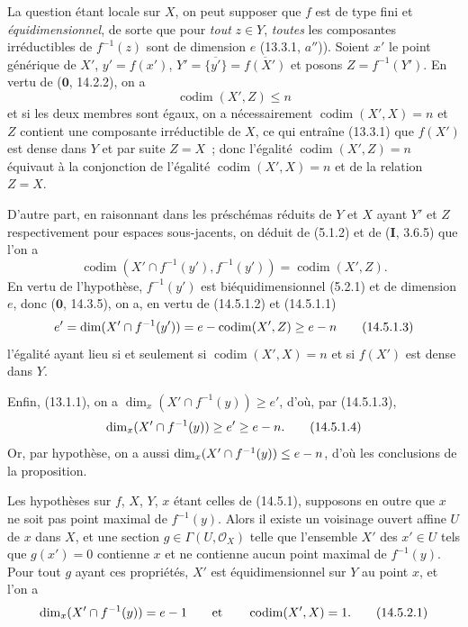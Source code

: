 La question étant locale sur $X$, on peut supposer que $f$ est de type fini et
\emph{équidimensionnel}, de sorte que pour \emph{tout} $z\in Y$, \emph{toutes} les
composantes irréductibles de $f^{-1}(z)$ sont de dimension $e$ (13.3.1, $a''$)).
Soient $x'$ le point générique de $X'$, $y'=f(x')$,
$Y'=\overline{\{y'\}}=\overline{f(X')}$ et posons $Z=f^{-1}(Y')$. En vertu de
($\mathbf 0$, 14.2.2), on a
\begin{equation}
  \operatorname{codim}(X',Z)\leq n
  \tag{14.5.1.1}\label{IV.14.5.1.1-fr}
\end{equation}
et si les deux membres sont égaux, on a nécessairement $\operatorname{codim}(X',X)=n$ et $Z$
contient une composante irréductible de $X$, ce qui entraîne (13.3.1) que
$f(X')$ est dense dans $Y$ et par suite $Z=X$~; donc l'égalité
$\operatorname{codim}(X',Z)=n$ équivaut à la conjonction de l'égalité $\operatorname{codim}(X',X)=n$ et de
la relation $Z=X$.

D'autre part, en raisonnant dans les préschémas réduits de $Y$ et $X$ ayant $Y'$
et $Z$ respectivement pour espaces sous-jacents, on déduit de (5.1.2) et de
(\textbf{I}, 3.6.5) que l'on a
\begin{equation}
  \operatorname{codim}(X'\cap f^{-1}(y'),f^{-1}(y'))=\operatorname{codim}(X',Z).
  \tag{14.5.1.2}\label{IV.14.5.1.2-fr}
\end{equation}
En vertu de l'hypothèse, $f^{-1}(y')$ est biéquidimensionnel (5.2.1) et de
dimension $e$, donc ($\mathbf 0$, 14.3.5), on a, en vertu de (14.5.1.2) et
(14.5.1.1)
\begin{equation}
  e'=\dim(X'\cap f^{-1}(y'))=e-\operatorname{codim}(X',Z)\geq e- n
  \tag{14.5.1.3}\label{IV.14.5.1.3-fr}
\end{equation}
l'égalité ayant lieu si et seulement si $\operatorname{codim}(X',X)=n$ et si $f(X')$ est dense
dans $Y$.

Enfin, (13.1.1), on a $\dim_x(X'\cap f^{-1}(y))\geq e'$, d'où, par
(14.5.1.3),
\begin{equation}
  \dim_x(X'\cap f^{-1}(y))\geq e'\geq e- n.
  \tag{14.5.1.4}\label{IV.14.5.1.4-fr}
\end{equation}
Or, par hypothèse, on a aussi $\dim_x(X'\cap f^{-1}(y))\leq e- n$, d'où les
conclusions de la proposition.

\begin{corollary}[14.5.2]
\label{IV.14.5.2-fr}
Les hypothèses sur $f$, $X$, $Y$, $x$ étant celles de \textup{(14.5.1)}, supposons en
outre que $x$ ne soit pas point maximal de $f^{-1}(y)$. Alors il existe un
voisinage ouvert affine $U$ de $x$ dans $X$, et une section
$g\in\Gamma(U,\mathcal O_X)$ telle que l'ensemble $X'$ des $x'\in U$ tels que
$g(x')=0$ contienne $x$ et ne contienne aucun point maximal de $f^{-1}(y)$. Pour
tout $g$ ayant ces propriétés, $X'$ est équidimensionnel sur $Y$ au point $x$, et
l'on a
\begin{equation}
  \dim_x(X'\cap f^{-1}(y))=e- 1 \qquad\text{et}\qquad \operatorname{codim}(X',X)=1.
  \tag{14.5.2.1}\label{IV.14.5.2.1-fr}
\end{equation}
\end{corollary}

